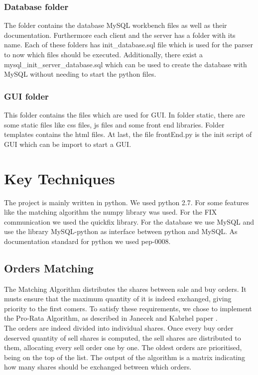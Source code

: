 \documentclass[a4paper, 11pt]{article}
\begin{document}
\subsubsection*{Database folder} 
The folder contains the database MySQL workbench files as well as their documentation. Furthermore each client and the server has
a folder with its name. Each of these folders has init\_database.sql file which is used for the parser to now which files should be
executed. Additionally, there exist a mysql\_init\_server\_database.sql which can be used to create the database with MySQL without
needing to start the python files.

\subsubsection*{GUI folder}
This folder contains the files which are used for GUI. In folder static, there are some static files like css files, js files
and some front end libraries. Folder templates contains the html files. At last, the file frontEnd.py is the init script of GUI which can be import to start a GUI. 


\section*{Key Techniques}

The project is mainly written in python. We used python 2.7. For some features like the matching algorithm the numpy library \cite{numpy} was used.
For the FIX communication we used the quickfix library. For the database we use MySQL and use the library MySQL-python as interface between python and MySQL.
As documentation standard for python we used pep-0008.

\subsection*{Orders Matching}

The Matching Algorithm distributes the shares between sale and buy orders. It musts ensure that the maximum quantity of it is indeed exchanged, giving priority to the first comers. To satisfy these requirements, we chose to implement the Pro-Rata Algorithm, as described in Janecek and Kabrhel paper \cite{paper}. \\
The orders are indeed divided into individual shares. Once every buy order deserved quantity of sell shares is computed, the sell shares are distributed to them, allocating every sell order one by one. The oldest orders are prioritised, being on the top of the list. The output of the algorithm is a matrix indicating how many shares should be exchanged between which orders. 
\end{document}
